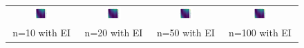 \documentclass[11pt]{article}
\begin{document}
\begin{figure}[H]
    \centering
    \begin{tabular}{cccc}
        \includegraphics[width=0.225\textwidth]{../Task-02/plots/true_function_matern_n10_EI.png} &
        \includegraphics[width=0.225\textwidth]{../Task-02/plots/true_function_matern_n20_EI.png} &
        \includegraphics[width=0.225\textwidth]{../Task-02/plots/true_function_matern_n50_EI.png} &
        \includegraphics[width=0.225\textwidth]{../Task-02/plots/true_function_matern_n100_EI.png} \\
        n=10 with EI & n=20 with EI & n=50 with EI & n=100 with EI \\[0.5em]
        

\end{tabular}
\end{figure}
\end{document}
